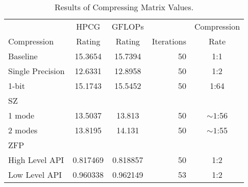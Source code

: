 \begin{table}
	\centering
	\begin{tabular}{l|S[table-format=2.6]|S[table-format=2.6]|r|c}
		            & {HPCG}   & {GFLOPs} &            & Compression \\
		Compression & {Rating} & {Rating} & Iterations & Rate \\
		\hline
		Baseline & 15.3654 & 15.7394 & 50 & 1:1 \\ %
		Single Precision & 12.6331 & 12.8958 & 50 & 1:2 \\
		1-bit & 15.1743 & 15.5452 & 50 & 1:64 \\ %
		SZ & & & & \\
		\hspace{3mm} 1 mode & 13.5037 & 13.813 & 50 & \(\sim 1\):56 \\
		\hspace{3mm} 2 modes & 13.8195 & 14.131 & 50 & \(\sim 1\):55 \\
		ZFP & & & & \\
		\hspace{3mm}High Level API & 0.817469 & 0.818857 & 50 & 1:2 \\
		\hspace{3mm}Low Level API & 0.960338 & 0.962149 & 53 & 1:2 \\
	\end{tabular}
	\caption{Results of Compressing Matrix Values.}
	\label{tab:results-val}
\end{table}
